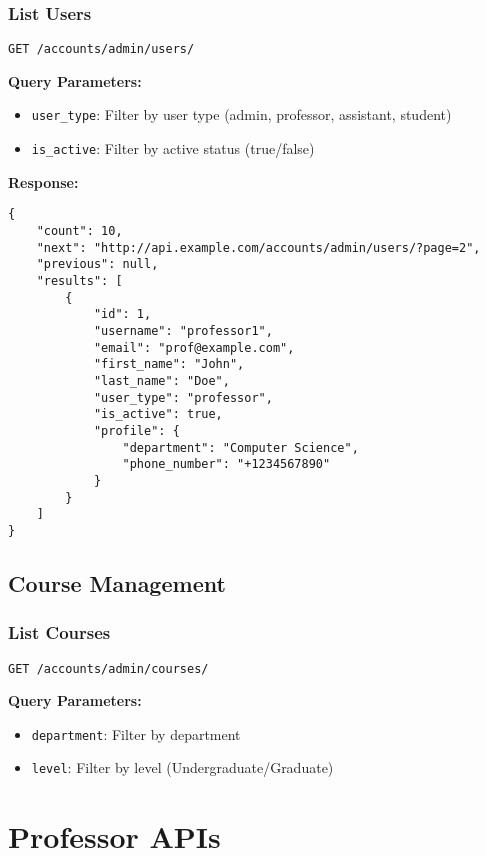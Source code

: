 \documentclass[11pt,a4paper]{article}
\begin{document}
\subsubsection{List Users}
\begin{lstlisting}[style=http]
GET /accounts/admin/users/
\end{lstlisting}

\textbf{Query Parameters:}
\begin{itemize}
    \item \texttt{user\_type}: Filter by user type (admin, professor, assistant, student)
    \item \texttt{is\_active}: Filter by active status (true/false)
\end{itemize}

\textbf{Response:}
\begin{lstlisting}[style=json]
{
    "count": 10,
    "next": "http://api.example.com/accounts/admin/users/?page=2",
    "previous": null,
    "results": [
        {
            "id": 1,
            "username": "professor1",
            "email": "prof@example.com",
            "first_name": "John",
            "last_name": "Doe",
            "user_type": "professor",
            "is_active": true,
            "profile": {
                "department": "Computer Science",
                "phone_number": "+1234567890"
            }
        }
    ]
}
\end{lstlisting}

\subsection{Course Management}

\subsubsection{List Courses}
\begin{lstlisting}[style=http]
GET /accounts/admin/courses/
\end{lstlisting}

\textbf{Query Parameters:}
\begin{itemize}
    \item \texttt{department}: Filter by department
    \item \texttt{level}: Filter by level (Undergraduate/Graduate)
\end{itemize}

\section{Professor APIs}
\end{document}
